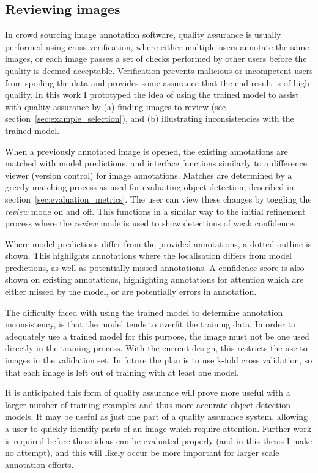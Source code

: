 \subsection{Reviewing images}
\label{sec:reviewing}

In crowd sourcing image annotation software, quality assurance is usually performed using cross verification, where  either multiple users annotate the same images, or each image passes a set of checks performed by other users before the quality is deemed acceptable. Verification prevents malicious or incompetent users from spoiling the data and provides some assurance that the end result is of high quality. In this work I prototyped the idea of using the trained model to assist with quality assurance by (a) finding images to review (see section~\ref{sec:example_selection}), and (b) illustrating inconsistencies with the trained model.

When a previously annotated image is opened, the existing annotations are matched with model predictions, and interface functions similarly to a difference viewer (version control) for image annotations. Matches are determined by a greedy matching process as used for evaluating object detection, described in section~\ref{sec:evaluation_metrics}. The user can view these changes by toggling the \emph{review} mode on and off. This functions in a similar way to the initial refinement process where the \emph{review} mode is used to show detections of weak confidence. 

Where model predictions differ from the provided annotations, a dotted outline is shown. This highlights annotations where the localisation differs from model predictions, as well as potentially missed annotations. A confidence score is also shown on existing annotations, highlighting annotations for attention which are either missed by the model, or are potentially errors in annotation.

The difficulty faced with using the trained model to determine annotation inconsistency, is that the model tends to overfit the training data. In order to adequately use a trained model for this purpose, the image must not be one used directly in the training process. With the current design, this restricts the use to images in the validation set. In future the plan is to use k-fold cross validation, so that each image is left out of training with at least one model. 

It is anticipated this form of quality assurance will prove more useful with a larger number of training examples and thus more accurate object detection models. It may be useful as just one part of a quality assurance system, allowing a user to quickly identify parts of an image which require attention. Further work is required before these ideas can be evaluated properly (and in this thesis I make no attempt), and this will likely occur be more important for larger scale annotation efforts.

